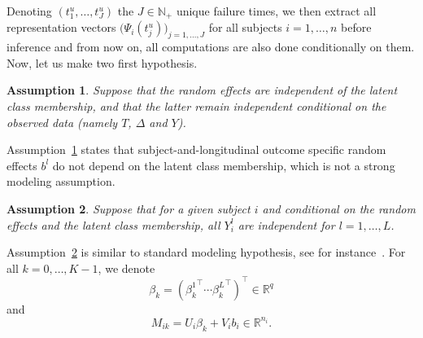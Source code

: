 \documentclass[11pt]{article}
\newtheorem{assumption}{Assumption}{\bf}{\rm}
\newcommand{\R}{\mathds R}
\newcommand{\N}{\mathds N}
\begin{document}
Denoting $(t_1^u, \ldots, t_J^u)$ the $J \in \N_+$ unique failure times, we then extract all representation vectors $\big(\Psi_i(t_j^u)\big)_{j=1,\ldots,J}$ for all subjects $i=1, \dots, n$ before inference and from now on, all computations are also done conditionally on them.
Now, let us make two first hypothesis.
\begin{assumption}
\label{assumption1}
Suppose that the random effects are independent of the latent class membership, and that the latter remain independent conditional on the observed data (namely $T$, $\Delta$ and $Y$).
\end{assumption}
Assumption~\ref{assumption1} states that subject-and-longitudinal outcome specific random effects $b^l$ do not depend on the latent class membership, which is not a strong modeling assumption.
\begin{assumption}
\label{indep-hyp-2}
Suppose that for a given subject $i$ and conditional on the random effects and the latent class membership, all $Y_i^l$ are independent for $l=1, \dots, L$.
\end{assumption}
Assumption~\ref{indep-hyp-2} is similar to standard modeling hypothesis, see for instance~\citet{tsiatis2004joint}.
For all $k = 0, \ldots, K-1$, we denote 
\[ \beta_k = ({\beta_k^1}^\top \cdots {\beta_k^L}^\top)^\top \in \R^q \] 
and 
\[M_{ik} = U_i\beta_k + V_ib_i \in \R^{n_i}. \]
\end{document}
